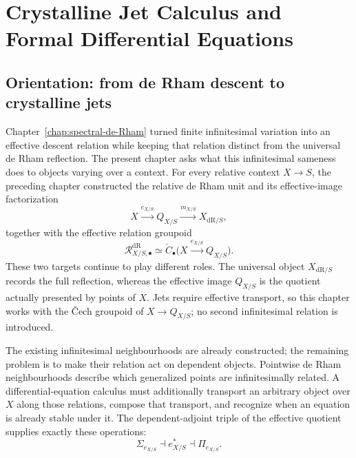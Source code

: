 \chapter{Crystalline Jet Calculus and Formal Differential Equations}
\label{chap:crystalline-jets}

\section{Orientation: from de Rham descent to crystalline jets}
\label{sec:jets-purpose}

Chapter~\ref{chap:spectral-de-Rham} turned finite infinitesimal variation
into an effective descent relation while keeping that relation distinct from the
universal de Rham reflection. The present chapter asks what this infinitesimal
sameness does to objects varying over a context. For every relative context
\(X\to S\), the preceding chapter constructed the relative de Rham unit and
its effective-image factorization
\[
  X\xrightarrow{e_{X/S}}Q_{X/S}
   \xrightarrow{m_{X/S}}X_{\mathrm{dR}/S},
\]
together with the effective relation groupoid
\[
  \mathcal R^{\mathrm{dR}}_{X/S,\bullet}
  \simeq
  \check C_\bullet
  \bigl(X\xrightarrow{e_{X/S}}Q_{X/S}\bigr).
\]
These two targets continue to play different roles. The universal object
\(X_{\mathrm{dR}/S}\) records the full reflection, whereas the effective image
\(Q_{X/S}\) is the quotient actually presented by points of \(X\). Jets require
effective transport, so this chapter works with the \v{C}ech groupoid of
\(X\to Q_{X/S}\); no second infinitesimal relation is introduced.

The existing infinitesimal neighbourhoods are already constructed; the remaining
problem is to make their relation act on dependent objects.
Pointwise de Rham neighbourhoods describe which generalized points are
infinitesimally related. A differential-equation calculus must additionally
transport an arbitrary object over \(X\) along those relations, compose that
transport, and recognize when an equation is already stable under it. The
dependent-adjoint triple of the effective quotient supplies exactly these
operations:
\[
  \Sigma_{e_{X/S}}
  \dashv
  e_{X/S}^*
  \dashv
  \Pi_{e_{X/S}}.
\]

